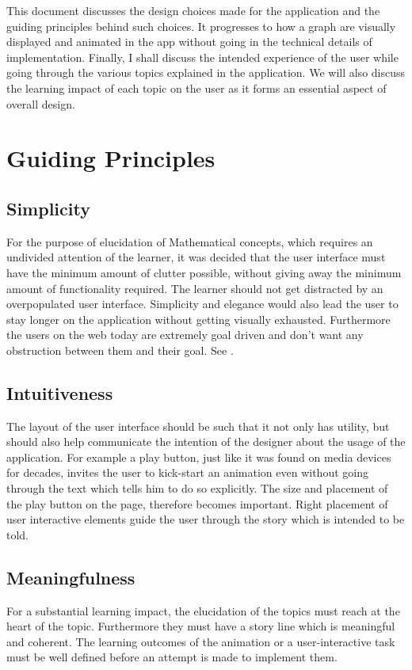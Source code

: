 \graphicspath{ {images/} }

This document discusses the design choices made for the application and the
guiding principles behind such choices. It progresses to how a graph are
visually displayed and animated in the app without going in the technical
details of implementation. Finally, I shall discuss the intended experience of
the user while going through the various topics explained in the application.
We will also discuss the learning impact of each topic on the user as it forms an essential
aspect of overall design.

\section{Guiding Principles}

\subsection{Simplicity}
\label{design: simplicity}
For the purpose of elucidation of Mathematical concepts, which requires an
undivided attention of the learner, it was decided that the user interface must
have the minimum amount of clutter possible, without giving away the minimum
amount of functionality required. The learner should not get distracted by an
overpopulated user interface. Simplicity and elegance would also lead the user
to stay longer on the application without getting visually exhausted.
Furthermore the users on the web today are extremely goal driven and don't want any
obstruction between them and their goal. See \cite{Karvonen2000}.

\subsection{Intuitiveness}
The layout of the user interface should be such that it not only has utility,
but should also help communicate the intention of the designer about the usage
of the application. For example a play button, just like it was found on media
devices for decades, invites the user to kick-start an animation even without
going through the text which tells him to do so explicitly. The size and
placement of the play button on the page, therefore becomes important. Right
placement of user interactive elements guide the user through the story which
is intended to be told.

\subsection{Meaningfulness}
For a substantial learning impact, the elucidation of the topics must reach at
the heart of the topic. Furthermore they must have a story line which is
meaningful and coherent. The learning outcomes of the animation or a
user-interactive task must be well defined before an attempt is made to
implement them.

